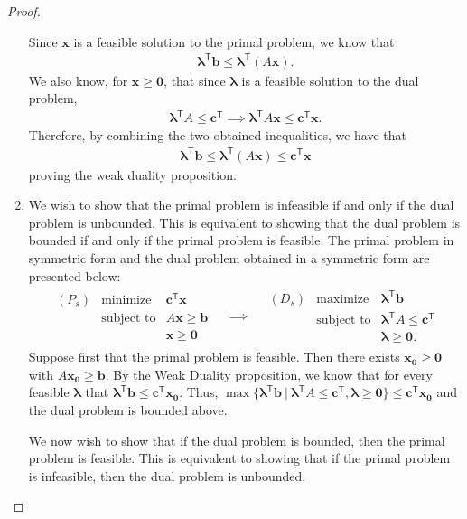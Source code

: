 \documentclass[12pt]{article}
\theoremstyle{definition}
\newcommand{\vc}[1]{\boldsymbol{#1}}
\newcommand{\tran}{\mathsf{T}}
\begin{document}
\begin{proof}
\begin{enumerate}
      Since $\vc{x}$ is a feasible solution to the primal problem, we know that
      \begin{align*}
        \vc{\lambda}^\tran \vc{b}\leq \vc{\lambda}^\tran (A\vc{x}).
      \end{align*}
      We also know, for $\vc{x} \geq \vc{0}$, that since $\vc{\lambda}$ is a feasible
      solution to the dual problem,
      \begin{align*}
        \vc{\lambda}^\tran A \leq \vc{c}^\tran \implies \vc{\lambda}^\tran A\vc{x} \leq \vc{c}^\tran\vc{x}.
      \end{align*}
      Therefore, by combining the two obtained inequalities, we have that
      \begin{align*}
        \vc{\lambda}^\tran \vc{b}\leq \vc{\lambda}^\tran (A\vc{x}) \leq \vc{c}^\tran\vc{x}
      \end{align*}
      proving the weak duality proposition.
    \item We wish to show that the primal problem is infeasible if and only if the dual problem is unbounded.
      This is equivalent to showing that the dual problem is bounded if and only if the primal problem is feasible.
      The primal problem in symmetric form and the dual problem obtained in a symmetric form are presented below:
      \begin{align*}
        \begin{array}{lrl}
          (P_s) & \text{minimize} & \vc{c}^\tran \vc{x} \\
          & \text{subject to} & A\vc{x} \geq \vc{b} \\
          & & \vc{x} \geq \vc{0}
        \end{array}
        \quad
        \implies
        \quad
        \begin{array}{lrl}
          (D_s) & \text{maximize} & \vc{\lambda}^\tran \vc{b} \\
          & \text{subject to} & \vc{\lambda}^\tran A \leq \vc{c}^\tran \\
          & & \vc{\lambda} \geq \vc{0}.
        \end{array}
      \end{align*}
      Suppose first that the primal problem is feasible. Then there exists $\vc{x_0} \geq \vc{0}$ with $A\vc{x_0} \geq \vc{b}$.
      By the Weak Duality proposition, we know that for every feasible
      $\vc{\lambda}$ that $\vc{\lambda}^\tran \vc{b} \leq \vc{c}^\tran\vc{x_0}$. Thus,
      $\max\{\vc{\lambda}^\tran \vc{b} \ |\ \vc{\lambda}^\tran A \leq \vc{c}^\tran, \vc{\lambda}\geq \vc{0} \} \leq \vc{c}^\tran\vc{x_0}$
      and the dual problem is bounded above.

      We now wish to show that if the dual problem is bounded, then the primal problem is feasible.
      This is equivalent to showing that if the primal problem is infeasible, then the dual problem is unbounded.
  \end{enumerate}

\end{proof}
\newpage
\end{document}
